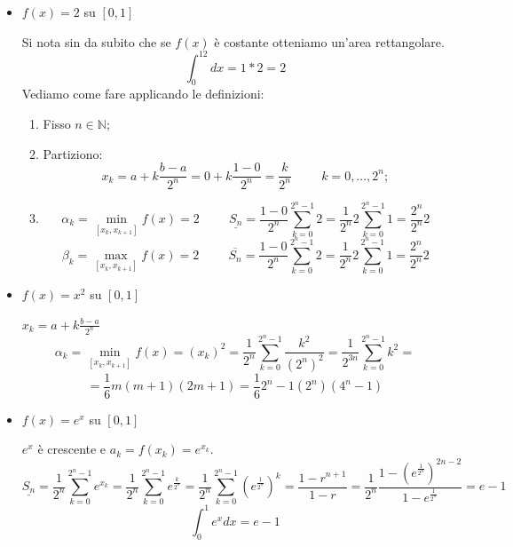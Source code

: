 \begin{example}
    \begin{itemize}
        \item $f(x)=2$ su $[0,1]$
        
        Si nota sin da subito che se $f(x)$ è costante otteniamo un'area rettangolare.
        \begin{equation*}
            \int_0^12dx=1*2=2
        \end{equation*}
        Vediamo come fare applicando le definizioni:
        \begin{enumerate}
            \item Fisso $n\in\mathbb{N}$;
            \item Partiziono: \begin{equation*}x_k=a+k\frac{b-a}{2^n}=0+k\frac{1-0}{2^n}=\frac{k}{2^n}\hspace{1cm}k=0,...,2^n;\end{equation*}
            \item \begin{equation*}\alpha_k=\min_{[x_k,x_{k+1}]}f(x)=2\hspace{1cm}\underline{S_n}=\frac{1-0}{2^n}\sum^{2^n-1}_{k=0}2=\frac{1}{2^n}2\sum^{2^n-1}_{k=0}1=\frac{2^n}{2^n}2\end{equation*}
            \begin{equation*}\beta_k=\max_{[x_k,x_{k+1}]}f(x)=2\hspace{1cm}\overline{S_n}=\frac{1-0}{2^n}\sum^{2^n-1}_{k=0}2=\frac{1}{2^n}2\sum^{2^n-1}_{k=0}1=\frac{2^n}{2^n}2\end{equation*}
        \end{enumerate}
        
        \item $f(x)=x^2$ su $[0,1]$
        
        $x_k=a+k\frac{b-a}{2^n}$
        \begin{equation*}
            \alpha_k=\min_{[x_k,x_{k+1}]}f(x)=(x_k)^2=\frac{1}{2^n}\sum^{2^n-1}_{k=0}\frac{k^2}{(2^n)^2}=\frac{1}{2^{3n}}\sum^{2^n-1}_{k=0}k^2=
        \end{equation*}
        \begin{equation*}
            =\frac{1}{6}m(m+1)(2m+1)=\frac{1}{6}2^n-1(2^n)(4^n-1)
        \end{equation*}
        
        \item $f(x)=e^x$ su $[0,1]$
        
        $e^x$ è crescente e $a_k=f(x_k)=e^{x_k}$.\\
        \begin{equation*}
            \underline{S_n}=\frac{1}{2^n}\sum^{2^n-1}_{k=0}e^{x_k}=\frac{1}{2^n}\sum^{2^n-1}_{k=0}e^{\frac{k}{2^n}}=\frac{1}{2^n}\sum^{2^n-1}_{k=0}(e^{\frac{1}{2^n}})^k=\frac{1-r^{n+1}}{1-r}=\frac{1}{2^n}\frac{1-(e^{\frac{1}{2^n}})^{2n-2}}{1-e^{\frac{1}{2^n}}}=e-1    
        \end{equation*}
        \begin{equation*}
            \int^1_0e^xdx=e-1
        \end{equation*}
    \end{itemize}
\end{example}

